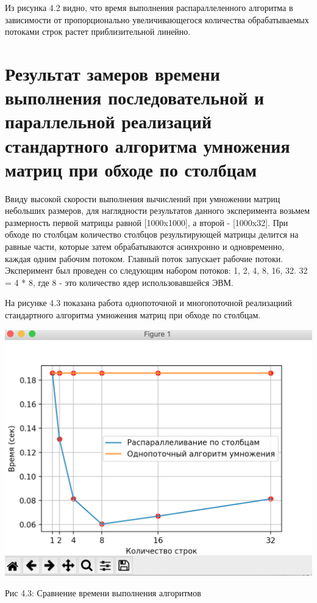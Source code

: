 \documentclass[12pt]{report}
\begin{document}
Из рисунка 4.2 видно, что время выполнения распараллеленного алгоритма в зависимости от пропорционально увеличивающегося количества обрабатываемых потоками строк растет приблизительной линейно.

\newpage
\section{Результат замеров времени выполнения последовательной и параллельной реализаций стандартного алгоритма умножения матриц при обходе по столбцам} 

Ввиду высокой скорости выполнения вычислений при умножении матриц небольших размеров, для наглядности результатов данного эксперимента возьмем размерность первой матрицы равной [1000x1000], а второй - [1000x32]. При обходе по столбцам количество столбцов результирующей матрицы делится на равные части, которые затем обрабатываются асинхронно и одновременно, каждая одним рабочим потоком. Главный поток запускает рабочие потоки. Эксперимент был проведен со следующим набором потоков: 1, 2, 4, 8, 16, 32. 32 = 4 * 8, где 8 - это количество ядер использовавшейся ЭВМ.

На рисунке 4.3 показана работа однопоточной и многопоточной реализациий стандартного алгоритма умножения матриц при обходе по столбцам.

\begin{center}
		\includegraphics[scale=0.6]{pics/Parallel3.png}
		
			Рис 4.3: Сравнение времени выполнения алгоритмов
\end{center}
\end{document}
